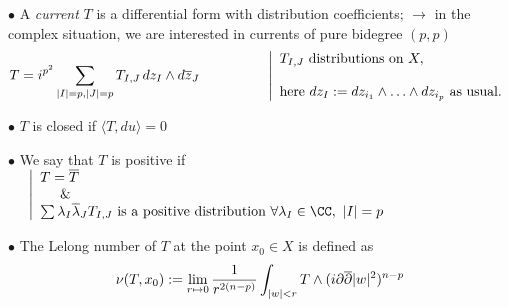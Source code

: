 \begin{slide}

\vspace{0.5cm}
\par\noindent 
$\bullet$ A {\sl current} $T$ is a differential form with distribution coefficients; 
\vskip 3pt
$\rightarrow$ in the complex situation, we are interested in currents of pure bidegree $(p,p)$
$$
T=i^{p^2}\sum_{|I|=p,|J|=p} T_{I,J}\,dz_I\wedge d\overline z_J\qquad
\hskip 1cm
\left|
\begin{array}{ll}
T_{I,J}\mbox{ distributions on }X,\\ \\
\mbox{here }dz_I:=dz_{i_1}\wedge\ldots\wedge dz_{i_p} 
\mbox{ as usual.}\end{array}\right. 
$$
\vskip 5pt
\par\noindent
$\bullet$ {$T$ is closed if $\langle T, du\rangle= 0$}
\vskip 5pt
 \par\noindent
$\bullet$ We say that $T$ is positive if $ \hskip 0.5cm
\left|
\begin{array}{ll}
T= \overline T \\
\mbox{\hskip 0.5cm}\& \\
\sum \lambda_I\overline\lambda_JT_{I,J}\mbox{ is a positive distribution }
\forall\lambda_I\in {\CC},\ |I|=p
\end{array}\right. 
$
\vskip 5pt
 \par\noindent
$\bullet$ The Lelong number of $T$ at the point $x_0\in X$ is defined as 
$$\nu (T, x_0):= \lim_{r\mapsto 0}{{1}\over {r^{2(n- p)}}}\int_{\vert w\vert < r}T\wedge 
(i\partial\overline\partial \vert w\vert ^2)^{n-p}$$

\end{slide}

